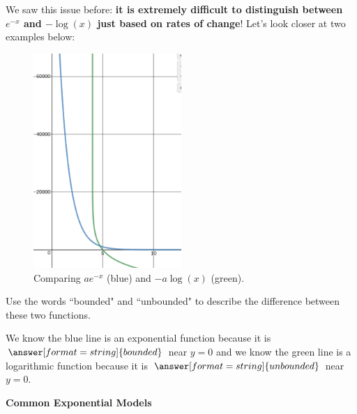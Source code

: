 \documentclass{ximera}
\begin{document}
\begin{theorem}
\end{theorem}

We saw this issue before: \textbf{it is extremely difficult to distinguish between $e^{-x}$ and $-\log(x)$ just based on rates of change}! Let's look closer at two examples below:

\begin{figure}
	\includegraphics[width=0.5\textwidth]{comparison.png}
	\caption{Comparing $ae^{-x}$ (blue) and $-a\log(x)$ (green).}
\end{figure}

\begin{question}
	Use the words ``bounded" and ``unbounded" to describe the difference between these two functions.
	
	We know the blue line is an exponential function because it is $\answer[format=string]{bounded}$ near $y=0$ and we know the green line is a logarithmic function because it is $\answer[format=string]{unbounded}$ near $y=0$. 
\end{question}

\begin{center} \textbf{\Large Common Exponential Models} \end{center}
\end{document}
